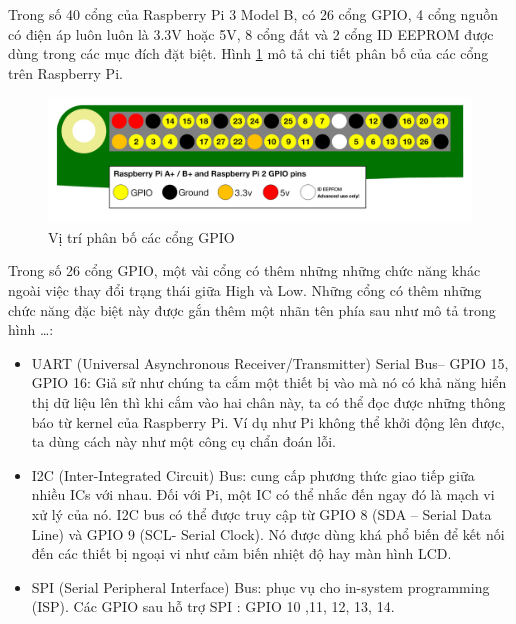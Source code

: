\documentclass[11pt,a4paper,oneside]{book}
\begin{document}
Trong số 40 cổng của Raspberry Pi 3 Model B, có 26 cổng GPIO, 4 cổng nguồn có điện áp luôn luôn là 3.3V hoặc 5V, 8 cổng đất và 2 cổng ID EEPROM được dùng trong các mục đích đặt biệt. Hình \ref{fig:4-vi-tri-phan-bo-gpio} mô tả chi tiết phân bố của các cổng trên Raspberry Pi.

\begin{figure}[h]
  \centering
     \includegraphics[scale=0.3]{4-vi-tri-phan-bo-gpio}
  \caption{Vị trí phân bố các cổng GPIO}\label{fig:4-vi-tri-phan-bo-gpio}
\end{figure}

Trong số 26 cổng GPIO, một vài cổng có thêm những những chức năng khác ngoài việc thay đổi trạng thái giữa High và Low. Những cổng có thêm những chức năng đặc biệt này được gắn thêm một nhãn tên phía sau như mô tả trong hình …: 

\begin{itemize}[topsep=1mm,itemsep=-0.5mm]
\item UART (Universal Asynchronous Receiver/Transmitter) Serial Bus– GPIO 15, GPIO 16: Giả sử như chúng ta cắm một thiết bị vào mà nó có khả năng hiển thị dữ liệu lên thì khi cắm vào hai chân này, ta có thể đọc được những thông báo từ kernel của Raspberry Pi. Ví dụ như Pi không thể khởi động lên được, ta dùng cách này như một công cụ chẩn đoán lỗi. 

\item I2C (Inter-Integrated Circuit) Bus: cung cấp phương thức giao tiếp giữa nhiều ICs với nhau. Đối với Pi, một IC có thể nhắc đến ngay đó là mạch vi xử lý của nó. I2C bus có thể được truy cập từ GPIO 8 (SDA – Serial Data Line) và GPIO 9 (SCL- Serial Clock). Nó được dùng khá phổ biến để kết nối đến các thiết bị ngoại vi như cảm biến nhiệt độ hay màn hình LCD.

\item SPI (Serial Peripheral Interface) Bus: phục vụ cho in-system programming (ISP). Các GPIO sau hỗ trợ SPI : GPIO 10 ,11, 12, 13, 14.
\vspace{1mm}
\end{itemize}

\end{document}
